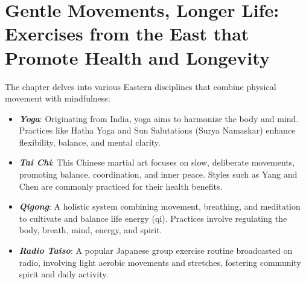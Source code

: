 \section*{Gentle Movements, Longer Life: Exercises from the East that Promote Health and Longevity}
The chapter delves into various Eastern disciplines that combine physical movement with mindfulness:
\begin{itemize}
    \item \textbf{\textit{Yoga}}: Originating from India, yoga aims to harmonize the body and mind. Practices like Hatha Yoga and Sun Salutations (Surya Namaskar) enhance flexibility, balance, and mental clarity.
    \item \textbf{\textit{Tai Chi}}: This Chinese martial art focuses on slow, deliberate movements, promoting balance, coordination, and inner peace. Styles such as Yang and Chen are commonly practiced for their health benefits.
    \item \textbf{\textit{Qigong}}: A holistic system combining movement, breathing, and meditation to cultivate and balance life energy (qi). Practices involve regulating the body, breath, mind, energy, and spirit.
    \item \textbf{\textit{Radio Taiso}}: A popular Japanese group exercise routine broadcasted on radio, involving light aerobic movements and stretches, fostering community spirit and daily activity.
\end{itemize}
